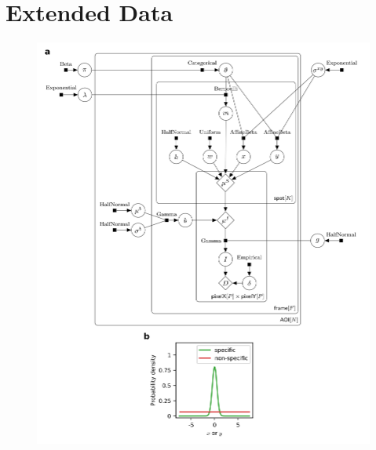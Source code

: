 \clearpage
\newpage
\section*{Extended Data}
\pagebreak

\renewcommand{\figurename}{Extended Data Fig.}
\renewcommand{\tablename}{Extended Data Table}
\setcounter{figure}{0}

\begin{figure}[t]
\centering
\includegraphics[width=\textwidth]{extended-data/figure1/figure1.png}
\label{fig:full_model}
\end{figure}

